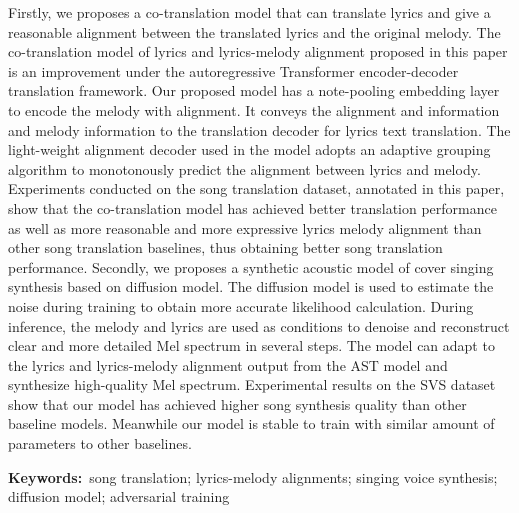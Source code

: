 Firstly, we proposes a co-translation model that can translate lyrics and give a reasonable alignment between the translated lyrics and the original melody. The co-translation model of lyrics and lyrics-melody alignment proposed in this paper is an improvement under the autoregressive Transformer encoder-decoder translation framework. Our proposed model has a note-pooling embedding layer to encode the melody with alignment. It conveys the alignment and information and melody information to the translation decoder for lyrics text translation. The light-weight alignment decoder used in the model adopts an adaptive grouping algorithm to monotonously predict the alignment between lyrics and melody. Experiments conducted on the song translation dataset, annotated in this paper, show that the co-translation model has achieved better translation performance as well as more reasonable and more expressive lyrics melody alignment than other song translation baselines, thus obtaining better song translation performance.
Secondly, we proposes a synthetic acoustic model of cover singing synthesis based on diffusion model. The diffusion model is used to estimate the noise during training to obtain more accurate likelihood calculation. During inference, the melody and lyrics are used as conditions to denoise and reconstruct clear and more detailed Mel spectrum in several steps. The model can adapt to the lyrics and lyrics-melody alignment output from the AST model and synthesize high-quality Mel spectrum. Experimental results on the SVS dataset show that our model has achieved higher song synthesis quality than other baseline models. Meanwhile our model is stable to train with similar amount of parameters to other baselines.

\noindent\textbf{Keywords:}~song translation; lyrics-melody alignments; singing voice synthesis; diffusion model; adversarial training
